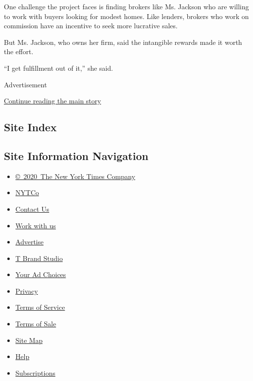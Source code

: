 One challenge the project faces is finding brokers like Ms. Jackson who
are willing to work with buyers looking for modest homes. Like lenders,
brokers who work on commission have an incentive to seek more lucrative
sales.

But Ms. Jackson, who owns her firm, said the intangible rewards made it
worth the effort.

``I get fulfillment out of it,'' she said.

Advertisement

\protect\hyperlink{after-bottom}{Continue reading the main story}

\hypertarget{site-index}{%
\subsection{Site Index}\label{site-index}}

\hypertarget{site-information-navigation}{%
\subsection{Site Information
Navigation}\label{site-information-navigation}}

\begin{itemize}
\tightlist
\item
  \href{https://help.nytimes.com/hc/en-us/articles/115014792127-Copyright-notice}{©~2020~The
  New York Times Company}
\end{itemize}

\begin{itemize}
\tightlist
\item
  \href{https://www.nytco.com/}{NYTCo}
\item
  \href{https://help.nytimes.com/hc/en-us/articles/115015385887-Contact-Us}{Contact
  Us}
\item
  \href{https://www.nytco.com/careers/}{Work with us}
\item
  \href{https://nytmediakit.com/}{Advertise}
\item
  \href{http://www.tbrandstudio.com/}{T Brand Studio}
\item
  \href{https://www.nytimes.com/privacy/cookie-policy\#how-do-i-manage-trackers}{Your
  Ad Choices}
\item
  \href{https://www.nytimes.com/privacy}{Privacy}
\item
  \href{https://help.nytimes.com/hc/en-us/articles/115014893428-Terms-of-service}{Terms
  of Service}
\item
  \href{https://help.nytimes.com/hc/en-us/articles/115014893968-Terms-of-sale}{Terms
  of Sale}
\item
  \href{https://spiderbites.nytimes.com}{Site Map}
\item
  \href{https://help.nytimes.com/hc/en-us}{Help}
\item
  \href{https://www.nytimes.com/subscription?campaignId=37WXW}{Subscriptions}
\end{itemize}
